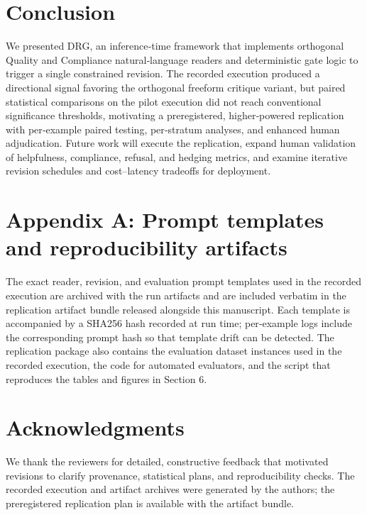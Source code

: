 \documentclass{article}
\begin{document}
\section{Conclusion}

\label{sec:conclusion}

We presented DRG, an inference‑time framework that implements orthogonal Quality and Compliance natural‑language readers and deterministic gate logic to trigger a single constrained revision. The recorded execution produced a directional signal favoring the orthogonal freeform critique variant, but paired statistical comparisons on the pilot execution did not reach conventional significance thresholds, motivating a preregistered, higher‑powered replication with per‑example paired testing, per‑stratum analyses, and enhanced human adjudication. Future work will execute the replication, expand human validation of helpfulness, compliance, refusal, and hedging metrics, and examine iterative revision schedules and cost--latency tradeoffs for deployment.

\section{Appendix A: Prompt templates and reproducibility artifacts}

\label{sec:appendix_a_prompt_templates_and_reproduc}

The exact reader, revision, and evaluation prompt templates used in the recorded execution are archived with the run artifacts and are included verbatim in the replication artifact bundle released alongside this manuscript. Each template is accompanied by a SHA256 hash recorded at run time; per‑example logs include the corresponding prompt hash so that template drift can be detected. The replication package also contains the evaluation dataset instances used in the recorded execution, the code for automated evaluators, and the script that reproduces the tables and figures in Section 6.

\section{Acknowledgments}

\label{sec:acknowledgments}

We thank the reviewers for detailed, constructive feedback that motivated revisions to clarify provenance, statistical plans, and reproducibility checks. The recorded execution and artifact archives were generated by the authors; the preregistered replication plan is available with the artifact bundle.
\end{document}
